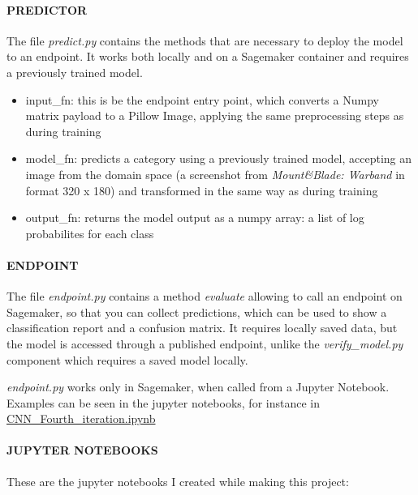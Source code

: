 \documentclass[
]{article}
\providecommand{\tightlist}{%
  \setlength{\itemsep}{0pt}\setlength{\parskip}{0pt}}
\begin{document}
\hypertarget{predictor}{%
\paragraph{PREDICTOR}\label{predictor}}

The file \emph{predict.py} contains the methods that are necessary to
deploy the model to an endpoint. It works both locally and on a
Sagemaker container and requires a previously trained model.

\begin{itemize}
\tightlist
\item
  input\_fn: this is be the endpoint entry point, which converts a Numpy
  matrix payload to a Pillow Image, applying the same preprocessing
  steps as during training
\item
  model\_fn: predicts a category using a previously trained model,
  accepting an image from the domain space (a screenshot from
  \emph{Mount\&Blade: Warband} in format 320 x 180) and transformed in
  the same way as during training
\item
  output\_fn: returns the model output as a numpy array: a list of log
  probabilites for each class
\end{itemize}

\hypertarget{endpoint}{%
\paragraph{ENDPOINT}\label{endpoint}}

The file \emph{endpoint.py} contains a method \emph{evaluate} allowing
to call an endpoint on Sagemaker, so that you can collect predictions,
which can be used to show a classification report and a confusion
matrix. It requires locally saved data, but the model is accessed
through a published endpoint, unlike the \emph{verify\_model.py}
component which requires a saved model locally.

\emph{endpoint.py} works only in Sagemaker, when called from a Jupyter
Notebook. Examples can be seen in the jupyter notebooks, for instance in
\url{CNN_Fourth_iteration.ipynb}

\hypertarget{jupyter-notebooks}{%
\paragraph{JUPYTER NOTEBOOKS}\label{jupyter-notebooks}}

These are the jupyter notebooks I created while making this project:
\end{document}
